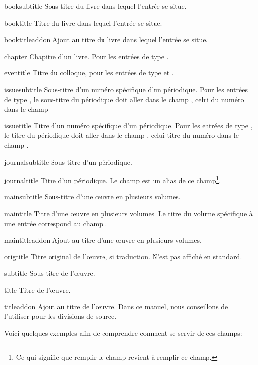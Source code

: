 \begin{choix}
	\item[booksubtitle]Sous-titre du livre dans lequel l'entrée se situe. 
   	\item[booktitle] Titre du livre dans lequel l'entrée se situe. 		
   	\item[booktitleaddon] Ajout au titre du livre dans lequel l'entrée se situe. 
   	\item[chapter] Chapitre d'un livre. Pour les entrées de type .	
   	\item[eventitle] Titre du colloque, pour les entrées de type  et .
   	\item[issuesubtitle] Sous-titre d'un numéro spécifique d'un périodique. 	Pour les entrées de type , le sous-titre du périodique doit aller dans le champ , celui du numéro dans le champ 		
   	\item[issuetitle] Titre d'un numéro spécifique d'un périodique. Pour les entrées de type , le titre du périodique doit aller dans le champ , celui titre du numéro dans le champ .		
   	\item[journalsubtitle] Sous-titre d'un périodique.							
   	\item[journaltitle] Titre d'un périodique. Le champ  est un alias de ce champ\footnote{Ce qui signifie que remplir le champ  revient à remplir ce champ.}.				
   	\item[mainsubtitle] Sous-titre d'une œuvre en plusieurs volumes.			
   	\item[maintitle] Titre d'une œuvre en plusieurs volumes. Le titre du volume spécifique à une entrée correspond au champ .						
   	\item[maintitleaddon]  Ajout au titre d'une œuvre en plusieurs volumes.		
   	\item[origtitle] Titre original de l'œuvre, si traduction. N'est pas affiché en standard. 	
   	\item[subtitle] Sous-titre de l'œuvre.									
   	\item[title] Titre de l'œuvre.									
   	\item[titleaddon] Ajout au titre de l'œuvre. Dans ce manuel, nous conseillons de l'utiliser pour les divisions de source.
\end{choix}

Voici quelques exemples afin de comprendre comment se servir de ces champs:

